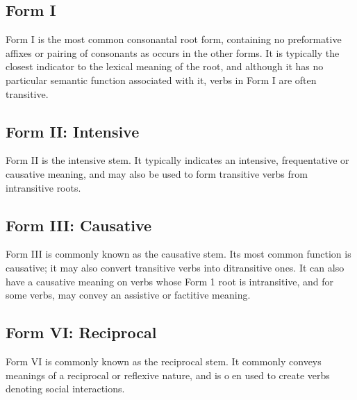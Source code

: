 \documentclass[grammar]{subfiles}
\begin{document}
  \subsection{Form I}
  \label{ssec:vm_verb_form_i}

  Form I is the most common consonantal root form, containing no preformative
  affixes or pairing of consonants as occurs in the other forms.  It is
  typically the closest indicator to the lexical meaning of the root, and
  although it has no particular semantic function associated with it, verbs in
  Form I are often transitive.


  \subsection{Form II: Intensive}
  \label{ssec:vm_form_ii}

  Form II is the intensive stem.  It typically indicates an intensive,
  frequentative or causative meaning, and may also be used to form transitive
  verbs from intransitive roots.
   
   
  \subsection{Form III: Causative}
  \label{ssec:vm_form_iii}

   Form III is commonly known as the causative stem.  Its most common function
   is causative; it may also convert transitive verbs into ditransitive ones.
   It can also have a causative meaning on verbs whose Form 1 root is
   intransitive, and for some verbs, may convey an assistive or factitive
   meaning.
   
%   
  \subsection{Form VI: Reciprocal}
  \label{ssec:vm_form_vi}

   Form VI is commonly known as the reciprocal stem.  It commonly conveys
   meanings of a reciprocal or reflexive nature, and is oen used to create
   verbs denoting social interactions. 
   
%   
\end{document}

